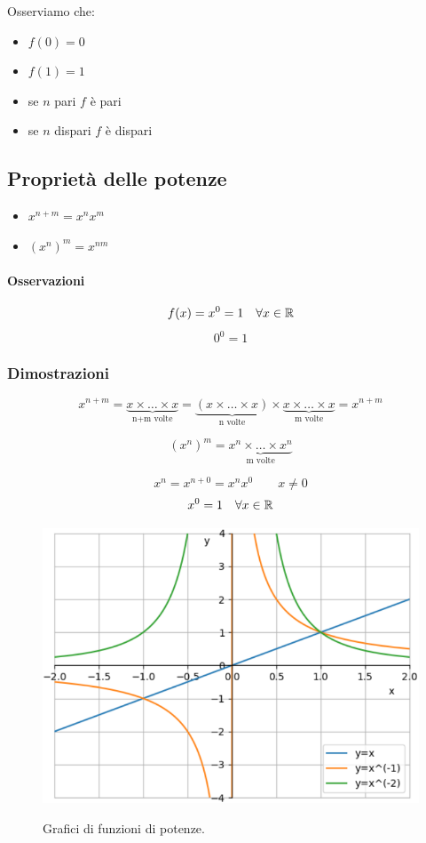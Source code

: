 Osserviamo che:
\begin{itemize}
	\item $f(0)=0$
	\item $f(1)=1$
	\item se $n$ pari $f$ è pari
	\item se $n$ dispari $f$ è dispari
\end{itemize}

\subsection{Proprietà delle potenze}
\begin{itemize}
\item $x^{n+m}=x^n x^m$
\item $(x^n)^m=x^{nm}$
\end{itemize}

\paragraph{Osservazioni}
\[f(x)=x^0=1 \quad \forall x \in \mathbb{R}\]
\[0^0=1\]

\subsubsection{Dimostrazioni}

\[x^{n+m}= \underbrace{x \times \dots \times x}_{\text{n+m volte}}=\underbrace{(x \times \dots \times x)}_{\text{n volte}}\times \underbrace{x \times \dots \times x}_{\text{m volte}}=x^{n+m}\]

\[(x^{n})^m= \underbrace{x^n \times \dots \times x^n}_{\text{m volte}}\]

\[x^n=x^{n+0}=x^n x^0 \qquad x\neq 0\]
\[x^0 = 1 \quad \forall x \in \mathbb{R}\]

\begin{figure}[H]
{\includegraphics[width=.9\linewidth]{gfx/3/potenze.png}}
\caption{Grafici di funzioni di potenze.}\label{fig:potenze}
\end{figure}

